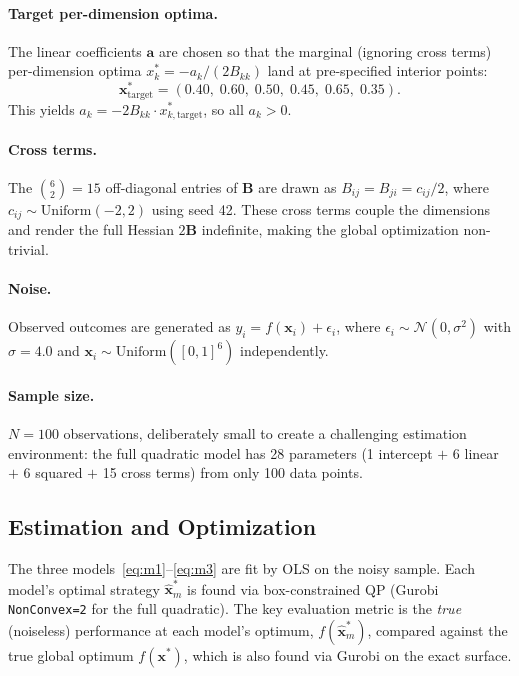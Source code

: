 \documentclass[12pt]{article}
\newcommand{\bx}{\mathbf{x}}
\newcommand{\bB}{\mathbf{B}}
\newcommand{\ba}{\mathbf{a}}
\begin{document}
\paragraph{Target per-dimension optima.} The linear coefficients $\ba$ are chosen so that the marginal (ignoring cross terms) per-dimension optima $x_k^* = -a_k / (2 B_{kk})$ land at pre-specified interior points:
\begin{equation}
    \bx^*_{\text{target}} = (0.40, \; 0.60, \; 0.50, \; 0.45, \; 0.65, \; 0.35).
\end{equation}
This yields $a_k = -2 B_{kk} \cdot x_{k,\text{target}}^*$, so all $a_k > 0$.

\paragraph{Cross terms.} The $\binom{6}{2} = 15$ off-diagonal entries of $\bB$ are drawn as $B_{ij} = B_{ji} = c_{ij}/2$, where $c_{ij} \sim \text{Uniform}(-2, 2)$ using seed 42. These cross terms couple the dimensions and render the full Hessian $2\bB$ indefinite, making the global optimization non-trivial.

\paragraph{Noise.} Observed outcomes are generated as $y_i = f(\bx_i) + \epsilon_i$, where $\epsilon_i \sim \mathcal{N}(0, \sigma^2)$ with $\sigma = 4.0$ and $\bx_i \sim \text{Uniform}([0,1]^6)$ independently.

\paragraph{Sample size.} $N = 100$ observations, deliberately small to create a challenging estimation environment: the full quadratic model has 28 parameters (1 intercept $+$ 6 linear $+$ 6 squared $+$ 15 cross terms) from only 100 data points.

\subsection{Estimation and Optimization}

The three models~\eqref{eq:m1}--\eqref{eq:m3} are fit by OLS on the noisy sample. Each model's optimal strategy $\hat{\bx}^*_m$ is found via box-constrained QP (Gurobi \texttt{NonConvex=2} for the full quadratic). The key evaluation metric is the \emph{true} (noiseless) performance at each model's optimum, $f(\hat{\bx}^*_m)$, compared against the true global optimum $f(\bx^*)$, which is also found via Gurobi on the exact surface.
\end{document}
